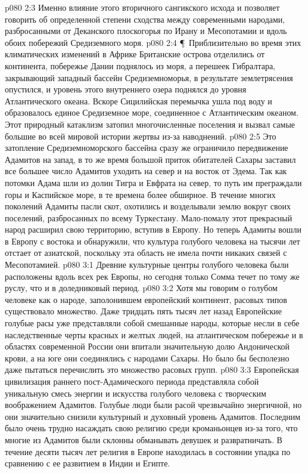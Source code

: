 \vs p080 2:3 Именно влияние этого вторичного сангикского исхода и позволяет говорить об определенной степени сходства между современными народами, разбросанными от Деканского плоскогорья по Ирану и Месопотамии и вдоль обоих побережий Средиземного моря.
\vs p080 2:4 \P\ Приблизительно во время этих климатических изменений в Африке Британские острова отделились от континента, побережье Дании поднялось из моря, а перешеек Гибралтара, закрывающий западный бассейн Средиземноморья, в результате землетрясения опустился, и уровень этого внутреннего озера поднялся до уровня Атлантического океана. Вскоре Сицилийская перемычка ушла под воду и образовалось единое Средиземное море, соединенное с Атлантическим океаном. Этот природный катаклизм затопил многочисленные поселения и вызвал самые большие во всей мировой истории жертвы из\hyp{}за наводнений.
\vs p080 2:5 Это затопление Средиземноморского бассейна сразу же ограничило передвижение Адамитов на запад, в то же время большой приток обитателей Сахары заставил все большее число Адамитов уходить на север и на восток от Эдема. Так как потомки Адама шли из долин Тигра и Евфрата на север, то путь им преграждали горы и Каспийское море, в те времена более обширное. В течение многих поколений Адамиты пасли скот, охотились и возделывали землю вокруг своих поселений, разбросанных по всему Туркестану. Мало\hyp{}помалу этот прекрасный народ расширил свою территорию, вступив в Европу. Но теперь Адамиты вошли в Европу с востока и обнаружили, что культура голубого человека на тысячи лет отстает от азиатской, поскольку эта область не имела почти никаких связей с Месопотамией.
\vs p080 3:1 Древние культурные центры голубого человека были расположены вдоль всех рек Европы, но сегодня только Сомма течет по тому же руслу, что и в доледниковый период.
\vs p080 3:2 Хотя мы говорим о голубом человеке как о народе, заполонившем европейский континент, расовых типов существовало множество. Даже тридцать пять тысяч лет назад Европейские голубые расы уже представляли собой смешанные народы, которые несли в себе наследственные черты красных и желтых людей, на атлантическом побережье и в областях современной России они впитали значительную долю Андонической крови, а на юге они соединялись с народами Сахары. Но было бы бесполезно даже пытаться перечислить это множество расовых групп.
\vs p080 3:3 Европейская цивилизация раннего пост\hyp{}Адамического периода представляла собой уникальную смесь энергии и искусства голубого человека с творческим воображением Адамитов. Голубые люди были расой чрезвычайно энергичной, но они значительно снизили культурный и духовный уровень Адамитов. Последним было очень трудно насаждать свою религию среди кроманьонцев из\hyp{}за того, что многие из Адамитов были склонны обманывать девушек и развратничать. В течение десяти тысяч лет религия в Европе находилась в состоянии упадка по сравнению с ее развитием в Индии и Египте.
